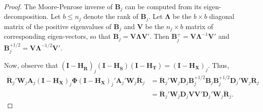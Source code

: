 \documentclass[12pt]{article}\usepackage[]{graphicx}\usepackage[]{color}
\newcommand{\bm}{\mathbf}
\newcommand{\bs}{\boldsymbol}
\begin{document}
\begin{proof}
The Moore-Penrose inverse of $\bm{B}_j$ can be computed from its eigen-decomposition. Let $b \leq n_j$ denote the rank of $\bm{B}_j$. 
Let $\bs\Lambda$ be the $b \times b$ diagonal matrix of the positive eigenvalues of $\bm{B}_j$ and $\bm{V}$ be the $n_j \times b$ matrix of corresponding eigen-vectors, so that $\bm{B}_j = \bm{V}\bs\Lambda\bm{V}'$. 
Then $\bm{B}_j^+ = \bm{V}\bs\Lambda^{-1}\bm{V}'$ and $\bm{B}_j^{+1/2} = \bm{V}\bs\Lambda^{-1/2}\bm{V}'$.

Now, observe that $\left(\bm{I} - \bm{H_{\ddot{R}}}\right)_j \left(\bm{I} - \bm{H_{\ddot{S}}}\right) \left(\bm{I} - \bm{H_T}\right) = \left(\bm{I} - \bm{H_X}\right)_j$. Thus, 
\begin{align}
\label{eq:step1}
\bm{\ddot{R}}_j' \bm{W}_j \bm{A}_j \left(\bm{I} - \bm{H_X}\right)_j \bs\Phi \left(\bm{I} - \bm{H_X}\right)_j' \bm{A}_j' \bm{W}_j \bm{\ddot{R}}_j &= \bm{\ddot{R}}_j' \bm{W}_j \bm{D}_j \bm{B}_j^{+1/2} \bm{B}_j \bm{B}_j^{+1/2} \bm{D}_j' \bm{W}_j \bm{\ddot{R}}_j \nonumber \\
&= \bm{\ddot{R}}_j' \bm{W}_j \bm{D}_j \bm{V}\bm{V}' \bm{D}_j' \bm{W}_j \bm{\ddot{R}}_j. 
\end{align}


\end{proof}
\end{document}
